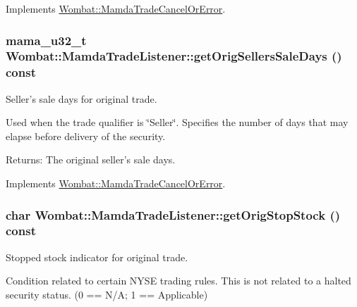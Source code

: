 Implements \hyperlink{classWombat_1_1MamdaTradeCancelOrError_905aa15d1b3b2b36fe28b395e059231a}{Wombat::Mamda\-Trade\-Cancel\-Or\-Error}.\hypertarget{classWombat_1_1MamdaTradeListener_7020c24d5e41e1a14734ffd8673ac860}{
\subsubsection[getOrigSellersSaleDays]{\setlength{\rightskip}{0pt plus 5cm}mama\_\-u32\_\-t Wombat::Mamda\-Trade\-Listener::get\-Orig\-Sellers\-Sale\-Days () const}}
\label{classWombat_1_1MamdaTradeListener_7020c24d5e41e1a14734ffd8673ac860}


Seller's sale days for original trade. 

Used when the trade qualifier is \char`\"{}Seller\char`\"{}. Specifies the number of days that may elapse before delivery of the security.

\begin{Desc}
\item[Returns:]The original seller's sale days. \end{Desc}


Implements \hyperlink{classWombat_1_1MamdaTradeCancelOrError_6df3a025f99a8d6328bcdda0fb4491f1}{Wombat::Mamda\-Trade\-Cancel\-Or\-Error}.\hypertarget{classWombat_1_1MamdaTradeListener_4a5498e32feec686f6989e3ced92a984}{
\subsubsection[getOrigStopStock]{\setlength{\rightskip}{0pt plus 5cm}char Wombat::Mamda\-Trade\-Listener::get\-Orig\-Stop\-Stock () const}}
\label{classWombat_1_1MamdaTradeListener_4a5498e32feec686f6989e3ced92a984}


Stopped stock indicator for original trade. 

Condition related to certain NYSE trading rules. This is not related to a halted security status. (0 == N/A; 1 == Applicable)

